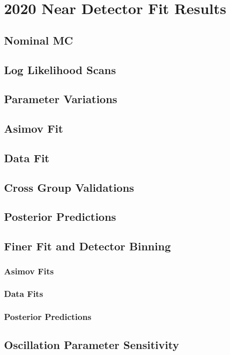 \chapter{2020 Near Detector Fit Results}\label{sec:2020Fit}
\section{Nominal MC}
\section{Log Likelihood Scans}\label{sec:llhscan}
\section{Parameter Variations}\label{sec:sigvar}
\section{Asimov Fit}\label{sec:asimov}
\section{Data Fit}
\section{Cross Group Validations}
\section{Posterior Predictions}
\section{Finer Fit and Detector Binning}
\subsection{Asimov Fits}
\subsection{Data Fits}
\subsection{Posterior Predictions}
\section{Oscillation Parameter Sensitivity}

\newpage
